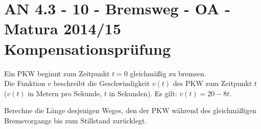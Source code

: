 \section{AN 4.3 - 10 - Bremsweg - OA - Matura 2014/15 Kompensationsprüfung}

\begin{beispiel}[AN 4.3]{1} %
Ein PKW beginnt zum Zeitpunkt $t=0$ gleichmäßig zu bremsen.\\
Die Funktion $v$ beschreibt die Geschwindigkeit $v(t)$ des PKW zum Zeitpunkt $t$ ($v(t)$ in Metern pro Sekunde, $t$ in Sekunden). Es gilt: $v(t)=20-8t$.

Berechne die Länge desjenigen Weges, den der PKW während des gleichmäßigen Bremsvorgangs bis zum Stillstand zurücklegt.

\end{beispiel}